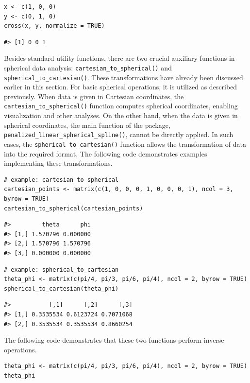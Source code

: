 \begin{verbatim}
x <- c(1, 0, 0)
y <- c(0, 1, 0)
cross(x, y, normalize = TRUE)
\end{verbatim}

\begin{verbatim}
#> [1] 0 0 1
\end{verbatim}

Besides standard utility functions, there are two crucial auxiliary functions in spherical data analysis: \texttt{cartesian\_to\_spherical()} and \texttt{spherical\_to\_cartesian()}. These transformations have already been discussed earlier in this section. For basic spherical operations, it is utilized as described previously. When data is given in Cartesian coordinates, the \texttt{cartesian\_to\_spherical()} function computes spherical coordinates, enabling visualization and other analyses. On the other hand, when the data is given in spherical coordinates, the main function of the  package, \texttt{penalized\_linear\_spherical\_spline()}, cannot be directly applied. In such cases, the \texttt{spherical\_to\_cartesian()} function allows the transformation of data into the required format.
The following code demonstrates examples implementing these transformations.

\begin{verbatim}
# example: cartesian_to_spherical
cartesian_points <- matrix(c(1, 0, 0, 0, 1, 0, 0, 0, 1), ncol = 3, byrow = TRUE)
cartesian_to_spherical(cartesian_points)
\end{verbatim}

\begin{verbatim}
#>         theta      phi
#> [1,] 1.570796 0.000000
#> [2,] 1.570796 1.570796
#> [3,] 0.000000 0.000000
\end{verbatim}

\begin{verbatim}
# example: spherical_to_cartesian
theta_phi <- matrix(c(pi/4, pi/3, pi/6, pi/4), ncol = 2, byrow = TRUE)
spherical_to_cartesian(theta_phi)
\end{verbatim}

\begin{verbatim}
#>           [,1]      [,2]      [,3]
#> [1,] 0.3535534 0.6123724 0.7071068
#> [2,] 0.3535534 0.3535534 0.8660254
\end{verbatim}

The following code demonstrates that these two functions perform inverse operations.

\begin{verbatim}
theta_phi <- matrix(c(pi/4, pi/3, pi/6, pi/4), ncol = 2, byrow = TRUE)
theta_phi
\end{verbatim}

